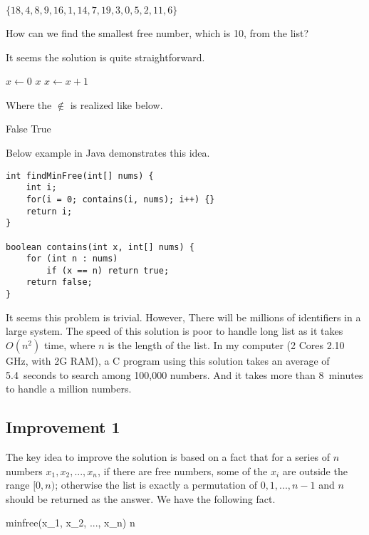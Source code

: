 \documentclass{article}
\begin{document}
$\{18, 4, 8, 9, 16, 1, 14, 7, 19, 3, 0, 5, 2, 11, 6\}$


How can we find the smallest free number, which is 10, from the list?

It seems the solution is quite straightforward.

\begin{algorithmic}[1]
  \State $x \gets 0$
  \Loop
      \State \Return $x$
    \Else
      \State $x \gets x + 1$
    \EndIf
  \EndLoop
\EndFunction
\end{algorithmic}

Where the $\notin$ is realized like below.

\begin{algorithmic}[1]
      \State \Return False
    \EndIf
  \EndFor
  \State \Return True
\EndFunction
\end{algorithmic}

Below example in Java demonstrates this idea.

\lstset{language=Java}
\begin{lstlisting}
int findMinFree(int[] nums) {
    int i;
    for(i = 0; contains(i, nums); i++) {}
    return i;
}

boolean contains(int x, int[] nums) {
    for (int n : nums)
        if (x == n) return true;
    return false;
}
\end{lstlisting}

It seems this problem is trivial. However, There will be millions of
identifiers in a large system. The speed of this solution is poor to handle long list as it takes $O(n^2)$ time, where $n$ is the length of the list.
In my computer (2 Cores 2.10 GHz, with 2G RAM), a C program using this
solution takes an average of 5.4~seconds to search among 100,000 numbers.
And it takes more than 8~minutes to handle a million numbers.

\subsection{Improvement 1}
The key idea to improve the solution is based on a fact that for a
series of $n$ numbers $x_1, x_2, ..., x_n$, if there are free numbers,
some of the $x_i$ are outside the range $[0, n)$; otherwise the list is
exactly a permutation of $0, 1, ..., n-1$ and $n$ should be
returned as the answer. We have the following fact.

\be
minfree(x_1, x_2, ..., x_n) \leq n
\label{min-free}
\ee
\end{document}
